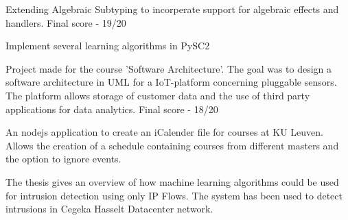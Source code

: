 \begin{cventries}
{\begin{cvitems}\item Extending Algebraic Subtyping to incorperate support for algebraic effects and handlers. Final score - 19/20
\end{cvitems}
}

{\begin{cvitems}\item Implement several learning algorithms in PySC2
\end{cvitems}
}

{\begin{cvitems}\item Project made for the course ’Software Architecture’. The goal was to design a software architecture in UML for a IoT-platform concerning pluggable sensors. The platform allows storage of customer data and the use of third party applications for data analytics. Final score - 18/20
\end{cvitems}
}

{\begin{cvitems}\item An nodejs application to create an iCalender file for courses at KU Leuven. Allows the creation of a schedule containing courses from different masters and the option to ignore events.
\end{cvitems}
}

{\begin{cvitems}\item The thesis gives an overview of how machine learning algorithms could be used for intrusion detection using only IP Flows. The system has been used to detect intrusions in Cegeka Hasselt Datacenter network.
\end{cvitems}
}


\end{cventries}
